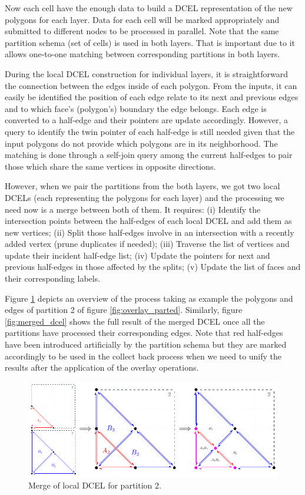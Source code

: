 Now each cell have the enough data to build a DCEL representation of the new polygons for each layer.  Data for each cell will be marked appropriately and submitted to different nodes to be processed in parallel.  Note that the same partition schema (set of cells) is used in both layers.  That is important due to it allows one-to-one matching between corresponding partitions in both layers.

During the local DCEL construction for individual layers, it is straightforward the connection between the edges inside of each polygon.  From the inputs, it can easily be identified the position of each edge relate to its next and previous edges and to which face's (polygon's) boundary the edge belongs.  Each edge is converted to a half-edge and their pointers are update accordingly.  However, a query to identify the twin pointer of each half-edge is still needed given that the input polygons do not provide which polygons are in its neighborhood. The matching is done through a self-join query among the current half-edges to pair those which share the same vertices in opposite directions.

However, when we pair the partitions from the both layers, we got two local DCELs (each representing the polygons for each layer) and the processing we need now is a merge between both of them.  It requires: (i) Identify the intersection points between the half-edges of each local DCEL and add them as new vertices; (ii) Split those half-edges involve in an intersection with a recently added vertex (prune duplicates if needed); (iii) Traverse the list of vertices and update their incident half-edge list; (iv) Update the pointers for next and previous half-edges in those affected by the splits; (v) Update the list of faces and their corresponding labels.

Figure \ref{fig:part2} depicts an overview of the process taking as example the polygons and edges of partition 2 of figure \ref{fig:overlay_parted}.  Similarly, figure \ref{fig:merged_dcel} shows the full result of the merged DCEL once all the partitions have processed their corresponding edges. Note that red half-edges have been introduced artificially by the partition schema but they are marked accordingly to be used in the collect back process when we need to unify the results after the application of the overlay operations.

\begin{figure}[!ht]
    \centering
    \includegraphics[width=0.9\linewidth]{figures/02-Part2}
    \caption{Merge of local DCEL for partition 2.}\label{fig:part2}
\end{figure}

